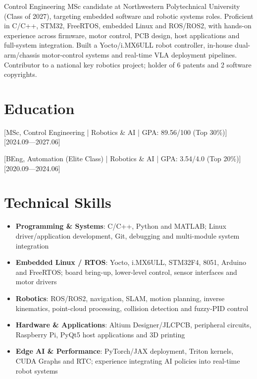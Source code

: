 \documentclass{resume-photo}
\begin{document}

\ResumeTitle

\noindent Control Engineering MSc candidate at Northwestern Polytechnical University (Class of 2027), targeting embedded software and robotic systems roles. Proficient in C/C++, STM32, FreeRTOS, embedded Linux and ROS/ROS2, with hands-on experience across firmware, motor control, PCB design, host applications and full-system integration. Built a Yocto/i.MX6ULL robot controller, in-house dual-arm/chassis motor-control systems and real-time VLA deployment pipelines. Contributor to a national key robotics project; holder of 6 patents and 2 software copyrights.

\section{Education}
[\textnormal{MSc, Control Engineering | Robotics \& AI | GPA: 89.56/100 (Top 30\%)}]
[2024.09—2027.06]

[\textnormal{BEng, Automation (Elite Class) | Robotics \& AI | GPA: 3.54/4.0 (Top 20\%)}]
[2020.09—2024.06]

\section{Technical Skills}
\begin{itemize}
  \item \textbf{Programming \& Systems}: C/C++, Python and MATLAB; Linux driver/application development, Git, debugging and multi-module system integration
  \item \textbf{Embedded Linux / RTOS}: Yocto, i.MX6ULL, STM32F4, 8051, Arduino and FreeRTOS; board bring-up, lower-level control, sensor interfaces and motor drivers
  \item \textbf{Robotics}: ROS/ROS2, navigation, SLAM, motion planning, inverse kinematics, point-cloud processing, collision detection and fuzzy-PID control
  \item \textbf{Hardware \& Applications}: Altium Designer/JLCPCB, peripheral circuits, Raspberry Pi, PyQt5 host applications and 3D printing
  \item \textbf{Edge AI \& Performance}: PyTorch/JAX deployment, Triton kernels, CUDA Graphs and RTC; experience integrating AI policies into real-time robot systems
\end{itemize}
\end{document}
